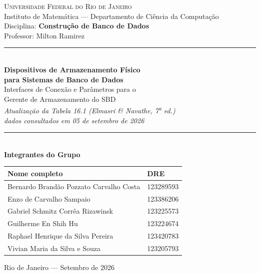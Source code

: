 \documentclass[11pt,a4paper]{article}
\begin{document}
\thispagestyle{empty}
\begin{center}
\vspace*{0.6cm}
{\large\scshape Universidade Federal do Rio de Janeiro}\\[2pt]
{\normalsize Instituto de Matemática --- Departamento de Ciência da Computação}\\[2pt]
{\normalsize Disciplina: \textbf{Construção de Banco de Dados}}\\[2pt]
{\normalsize Professor: Milton Ramirez}\\[1.6cm]

{\color{linha}\rule{\textwidth}{1.2pt}}\\[0.7cm]
{\LARGE\bfseries Dispositivos de Armazenamento Físico\\[6pt] para Sistemas de Banco de Dados}\\[0.5cm]
{\large Interfaces de Conexão e Parâmetros para o\\ Gerente de Armazenamento do SBD}\\[0.5cm]
{\normalsize\itshape Atualização da Tabela 16.1 (Elmasri \& Navathe, 7\textsuperscript{a} ed.)\\ dados consultados em 05 de setembro de 2026}\\[0.6cm]
{\color{linha}\rule{\textwidth}{1.2pt}}\\[1.4cm]

{\large\bfseries Integrantes do Grupo}\\[0.5cm]
\begin{minipage}{0.85\textwidth}\centering
\begin{tabular}{@{}p{9.2cm}p{3.4cm}@{}}
\toprule
\textbf{Nome completo} & \textbf{DRE} \\
\midrule
Bernardo Brandão Pozzato Carvalho Costa & 123289593 \\
Enzo de Carvalho Sampaio & 123386206 \\
Gabriel Schmitz Corrêa Rizawinsk & 123225573 \\
Guilherme En Shih Hu & 123224674 \\
Raphael Henrique da Silva Pereira & 123420783 \\
Vivian Maria da Silva e Souza & 123205793 \\
\bottomrule
\end{tabular}
\end{minipage}

\vfill
{\normalsize Rio de Janeiro --- Setembro de 2026}
\end{center}
\newpage
\end{document}
